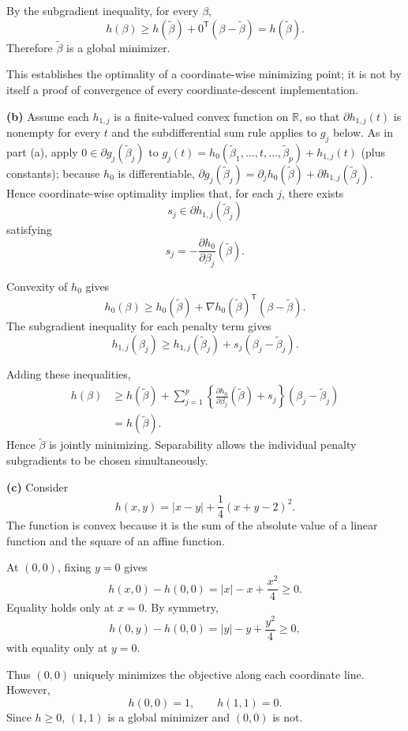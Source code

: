\documentclass[answers,12pt,addpoints]{exam}
\providecommand{\R}{\mathbb{R}}
\providecommand{\trans}{^{\mathsf T}}
\begin{document}
\begin{questions}
\begin{solution}
By the subgradient inequality, for every $\beta$,
\[
h(\beta)
\geq
h(\widetilde\beta)
+
0\trans(\beta-\widetilde\beta)
=
h(\widetilde\beta).
\]
Therefore $\widetilde\beta$ is a global minimizer.

This establishes the optimality of a coordinate-wise minimizing
point; it is not by itself a proof of convergence of every
coordinate-descent implementation.

\textbf{(b)}
Assume each $h_{1,j}$ is a finite-valued convex function on $\R$,
so that $\partial h_{1,j}(t)$ is nonempty for every $t$ and the
subdifferential sum rule applies to $g_j$ below.
As in part (a), apply $0\in\partial g_j(\widetilde\beta_j)$ to
$g_j(t)=h_0(\widetilde\beta_1,\ldots,t,\ldots,\widetilde\beta_p)+h_{1,j}(t)$
(plus constants); because $h_0$ is differentiable,
$\partial g_j(\widetilde\beta_j)=\partial_jh_0(\widetilde\beta)
+\partial h_{1,j}(\widetilde\beta_j)$.
Hence coordinate-wise optimality implies that, for each $j$, there exists
\[
s_j\in\partial h_{1,j}(\widetilde\beta_j)
\]
satisfying
\[
s_j=-\frac{\partial h_0}{\partial\beta_j}(\widetilde\beta).
\]

Convexity of $h_0$ gives
\[
h_0(\beta)
\geq
h_0(\widetilde\beta)
+
\nabla h_0(\widetilde\beta)\trans
(\beta-\widetilde\beta).
\]
The subgradient inequality for each penalty term gives
\[
h_{1,j}(\beta_j)
\geq
h_{1,j}(\widetilde\beta_j)
+
s_j(\beta_j-\widetilde\beta_j).
\]

Adding these inequalities,
\begin{align*}
h(\beta)
&\geq
h(\widetilde\beta)
+
\sum_{j=1}^p
\left\{
\frac{\partial h_0}{\partial\beta_j}(\widetilde\beta)
+s_j
\right\}
(\beta_j-\widetilde\beta_j)\\
&=
h(\widetilde\beta).
\end{align*}
Hence $\widetilde\beta$ is jointly minimizing.
Separability allows the individual penalty subgradients to
be chosen simultaneously.

\textbf{(c)}
Consider
\[
\boxed{
h(x,y)=|x-y|+\frac14(x+y-2)^2.
}
\]
The function is convex because it is the sum of the absolute
value of a linear function and the square of an affine function.

At $(0,0)$, fixing $y=0$ gives
\[
h(x,0)-h(0,0)
=
|x|-x+\frac{x^2}{4}
\geq0.
\]
Equality holds only at $x=0$.
By symmetry,
\[
h(0,y)-h(0,0)
=
|y|-y+\frac{y^2}{4}
\geq0,
\]
with equality only at $y=0$.

Thus $(0,0)$ uniquely minimizes the objective along each
coordinate line. However,
\[
h(0,0)=1,
\qquad
h(1,1)=0.
\]
Since $h\geq0$, $(1,1)$ is a global minimizer and $(0,0)$ is not.


\end{solution}
\end{questions}
\end{document}

